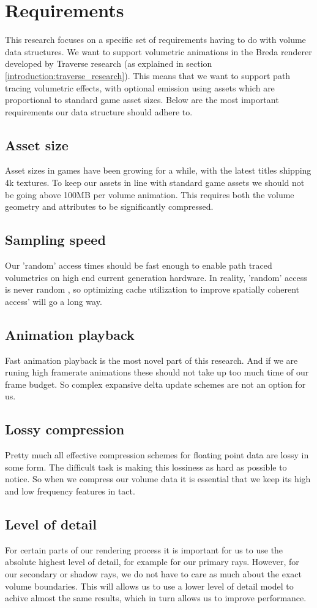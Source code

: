 \section{Requirements} \label{requirements}
This research focuses on a specific set of requirements having to do with volume data structures. We want to support volumetric animations in the Breda renderer developed by Traverse research (as explained in section \ref{introduction:traverse_research}). This means that we want to support path tracing volumetric effects, with optional emission using assets which are proportional to standard game asset sizes. Below are the most important requirements our data structure should adhere to.
\subsection{Asset size} \label{requirements:asset_size}
Asset sizes in games have been growing for a while, with the latest titles shipping 4k textures. To keep our assets in line with standard game assets we should not be going above 100MB per volume animation. This requires both the volume geometry and attributes to be significantly compressed.
\subsection{Sampling speed} \label{requirements:sampling_speed}
Our 'random' access times should be fast enough to enable path traced volumetrics on high end current generation hardware. In reality, 'random' access is never random \cite{museth2013vdb}, so optimizing cache utilization to improve spatially coherent access' will go a long way.
\subsection{Animation playback} \label{requirements:animation_playback}
Fast animation playback is the most novel part of this research. And if we are runing high framerate animations these should not take up too much time of our frame budget. So complex expansive delta update schemes are not an option for us.
\subsection{Lossy compression} \label{requirements:lossy_compression}
Pretty much all effective compression schemes for floating point data are lossy in some form. The difficult task is making this lossiness as hard as possible to notice. So when we compress our volume data it is essential that we keep its high and low frequency features in tact.
\subsection{Level of detail} \label{requirements:level_of_detail}
For certain parts of our rendering process it is important for us to use the absolute highest level of detail, for example for our primary rays. However, for our secondary or shadow rays, we do not have to care as much about the exact volume boundaries. This will allows us to use a lower level of detail model to achive almost the same results, which in turn allows us to improve performance.

